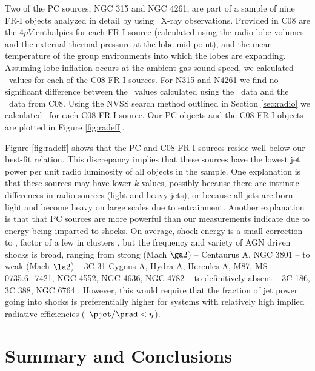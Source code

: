 \documentclass{emulateapj}
\begin{document}
Two of the PC sources, NGC 315 and NGC 4261, are part of a sample of
nine FR-I objects analyzed in detail by \citet[][hereafter
C08]{2008MNRAS.386.1709C} using \xmm\ X-ray observations. Provided in
C08 are the $4pV$ enthalpies for each FR-I source (calculated using
the radio lobe volumes and the external thermal pressure at the lobe
mid-point), and the mean temperature of the group environments into
which the lobes are expanding. Assuming lobe inflation occurs at the
ambient gas sound speed, we calculated \pcav\ values for each of the
C08 FR-I sources. For N315 and N4261 we find no significant difference
between the \pcav\ values calculated using the \chandra\ data and the
\xmm\ data from C08. Using the NVSS search method outlined in Section
\ref{sec:radio} we calculated \phigh\ for each C08 FR-I source. Our PC
objects and the C08 FR-I objects are plotted in Figure
\ref{fig:radeff}.

Figure \ref{fig:radeff} shows that the PC and C08 FR-I sources reside
well below our best-fit relation. This discrepancy implies that these
sources have the lowest jet power per unit radio luminosity of all
objects in the sample. One explanation is that these sources may have
lower $k$ values, possibly because there are intrinsic differences in
radio sources (light and heavy jets), or because all jets are born
light and become heavy on large scales due to entrainment. Another
explanation is that that PC sources are more powerful than our
measurements indicate due to energy being imparted to shocks. On
average, shock energy is a small correction to \pcav, factor of a few
in clusters \citep{mcnamrev}, but the frequency and variety of AGN
driven shocks is broad, ranging from strong (Mach $\ga 2$) --
Centaurus A, NGC 3801 \citep{2003ApJ...592..129K, 2009MNRAS.395.1999C,
2007ApJ...660..191C} -- to weak (Mach $\la 2$) -- 3C 31 Cygnus A,
Hydra A, Hercules A, M87, MS 0735.6+7421, NGC 4552, NGC 4636, NGC 4782
\citep{2002MNRAS.336.1161L, 2006ApJ...644L...9W, hydraa, herca,
2007ApJ...665.1057F, ms0735, 2006ApJ...648..947M, 2009arXiv0909.2942B,
2007ApJ...664..804M} -- to definitively absent -- 3C 186, 3C 388, NGC
6764 \citep{2008ApJ...684..811S, 2006ApJ...639..753K,
2008ApJ...688..190C}. However, this would require that the fraction of
jet power going into shocks is preferentially higher for systems with
relatively high implied radiative efficiencies (\ie\ $\pjet/\prad <
\eta$).

\section{Summary and Conclusions}
\label{sec:summary}
\end{document}

